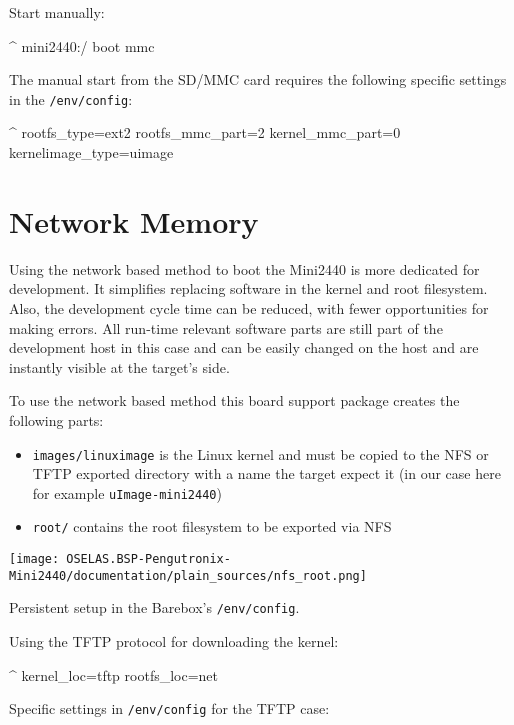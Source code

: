 Start manually:

\begin{ptxshell}[escapechar=|]{^}
mini2440:/ boot mmc
\end{ptxshell}

The manual start from the SD/MMC card requires the following specific settings
in the \texttt{/env/config}:

\begin{ptxshell}[escapechar=|]{^}
rootfs_type=ext2
rootfs_mmc_part=2
kernel_mmc_part=0
kernelimage_type=uimage
\end{ptxshell}

\section{Network Memory}				\label{sec:networkmem}

Using the network based method to boot the Mini2440 is more dedicated for
development. It simplifies replacing software in the kernel and root filesystem.
Also, the development cycle time can be reduced, with fewer opportunities for
making errors. All run-time relevant software parts are still
part of the development host in this case and can be easily changed on the
host and are instantly visible at the target's side.

To use the network based method this board support package creates the
following parts:

\begin{itemize}
\item \texttt{\ptxdistPlatformDir images/linuximage} is the Linux kernel
	and must be copied to the NFS or TFTP exported directory with a
	name the target expect it (in our case here for example
	\texttt{uImage-mini2440})
\item \texttt{\ptxdistPlatformDir root/} contains the root filesystem
	to be exported via NFS
\end{itemize}

\centerline{\texttt{[image: OSELAS.BSP-Pengutronix-Mini2440/documentation/plain\_sources/nfs\_root.png]}}

Persistent setup in the Barebox's \texttt{/env/config}.

Using the TFTP protocol for downloading the kernel:

\begin{ptxshell}[escapechar=|]{^}
kernel_loc=tftp
rootfs_loc=net
\end{ptxshell}

Specific settings in \texttt{/env/config} for the TFTP case:

